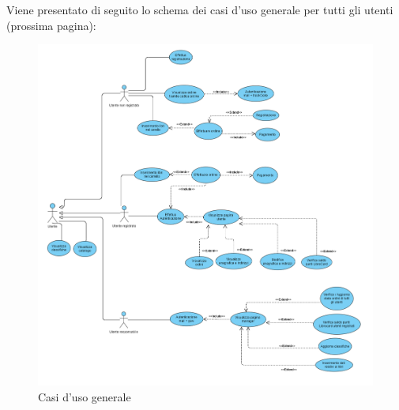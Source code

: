 \documentclass[a4paper,11pt]{report}
\begin{document}
Viene presentato di seguito lo schema dei casi d'uso generale per tutti gli utenti (prossima pagina):
\begin{figure}[h!]
	\centering
	\includegraphics[width=1.1\linewidth]{Use cases diagrams/Use Case generale.png}
	\caption{Casi d'uso generale}
\end{figure}\\

\newpage
\end{document}
